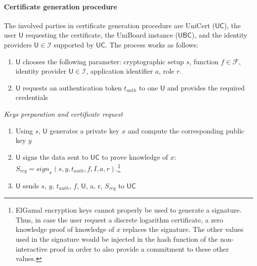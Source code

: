 \documentclass[bibtotoc,halfparskip,oneside]{scrreprt}
\newcommand{\User}{\ensuremath{\mathsf{U}}\xspace}
\newcommand{\IdentityProvider}{\ensuremath{\mathsf{U}}\xspace}
\newcommand{\UBC}{\ensuremath{\mathsf{UBC}}\xspace}
\newcommand{\UC}{\ensuremath{\mathsf{UC}}\xspace}
\begin{document}
	\paragraph*{Certificate generation procedure} The involved parties in certificate generation procedure are UniCert (\UC), the user $\User$ requesting the certificate, the UniBoard instance (\UBC), and the identity providers $\IdentityProvider\in\mathcal{I}$ supported by \UC. The process works as follows:
	
	\begin{enumerate}
		\item $\User$ chooses the following parameter: cryptographic setup $s$, function $\mathit{f} \in \mathcal{F}$, identity provider $\IdentityProvider \in \mathcal{I}$, application identifier $a$, role $r$.
		\item $\User$ requests an authentication token $t_{auth}$ to one $\IdentityProvider$ and provides the required credentials
	\end{enumerate} 
	
	\textit{Keys preparation and certificate request}
	\begin{enumerate}[resume]
		\item Using $s$, $\User$ generates a private key $x$ and compute the corresponding public key $y$
		\item $\User$ signs the data sent to \UC to prove knowledge of $x$: $S_{req} = \mathit{sign}_{x}(s, y, t_{auth},\mathit{f}, I, a, r)$.\footnote{ElGamal encryption keys cannot properly be used to generate a signature. Thus, in case the user request a discrete logarithm certificate, a zero knowledge proof of knowledge of $x$ replaces the signature. The other values used in the signature would be injected in the hash function of the non-interactive proof in order to also provide a commitment to these other values.}
		\item $\User$ sends $s$, $y$, $t_{auth}$, $\mathit{f}$, $\IdentityProvider$, a, r, $S_{req}$ to \UC
	\end{enumerate} 
	
	
\end{document}
